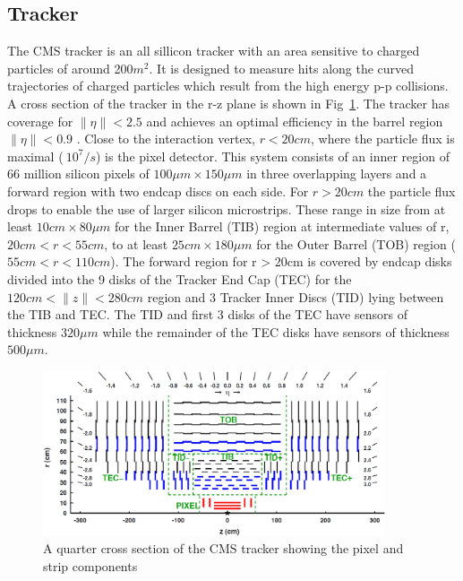 \subsection{Tracker}
The CMS tracker is an all sillicon tracker with an area sensitive to charged particles of around 200$m^2$. It is designed to measure hits along the
curved trajectories of charged particles which result from the high energy p-p collisions. A cross section of the tracker in the r-z plane is shown in Fig~\ref{TRACKER_SLICE}.
The tracker has coverage for $\|\eta\| < 2.5$ and achieves an optimal efficiency in the barrel region $\|\eta\| < 0.9$ \cite{tracker_performance,tracker_tdr}. 
Close to the interaction vertex, $r < 20cm$, where the particle flux is maximal ($~10^7/s$) is the pixel detector. This system consists of an inner region of 66 million silicon 
pixels of $100\mu m \times 150\mu m$ in three overlapping layers and a forward region with two endcap discs on each side.
For $r > 20cm$ the particle flux drops to enable the use of larger silicon microstrips. These range in size from at least $10cm \times 80\mu m$ for the Inner Barrel (TIB) region 
at intermediate values of r, $20cm < r < 55cm$, to at least $25cm \times 180\mu m$ for the Outer Barrel (TOB) region ($55cm < r < 110cm$). The forward region
for r > 20cm is covered by endcap disks divided into the 9 disks of the Tracker End Cap (TEC) for the $120cm < \|z\| < 280 cm$ region and 
3 Tracker Inner Discs (TID) lying between the TIB and TEC. The TID and first 3 disks of the TEC have sensors of thickness $320\mu m$ while the remainder of the TEC disks
have sensors of thickness $500\mu m$\cite{tracker_tdr}.

\begin{figure}
\centering
    \includegraphics[width=0.9\textwidth]{./Figures/detector/CMS2Dtracker}
  \caption{A quarter cross section of the CMS tracker showing the pixel and strip components \cite{tracker_fig}}
  \label{TRACKER_SLICE}
\end{figure}

